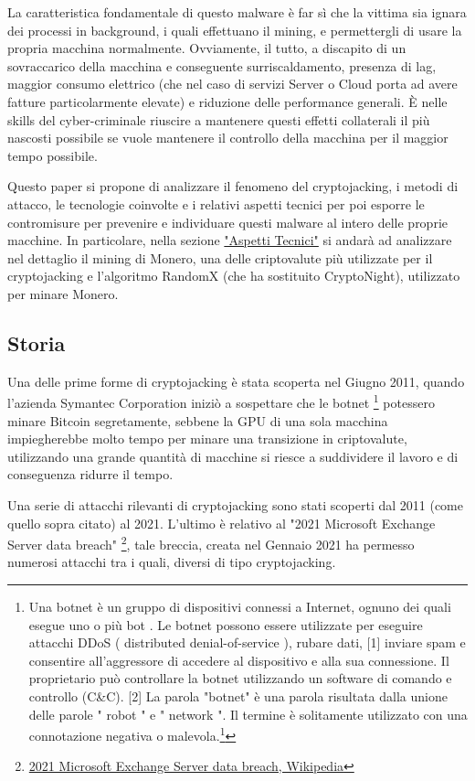 \documentclass[12pt,a4paper]{article}
\begin{document}
La caratteristica fondamentale di questo malware è far sì che la vittima sia
ignara dei processi in background, i quali effettuano il mining, e
permettergli di usare la propria macchina normalmente. Ovviamente, il tutto, a
discapito di un sovraccarico della macchina e conseguente surriscaldamento,
presenza di lag, maggior consumo elettrico (che nel caso di servizi Server o
Cloud porta ad avere fatture particolarmente elevate) e riduzione delle
performance generali. È nelle skills del cyber-criminale riuscire a mantenere 
questi effetti collaterali il più nascosti possibile se vuole mantenere il controllo della macchina per il maggior tempo possibile.

Questo paper si propone di analizzare il fenomeno del cryptojacking, i metodi di
attacco, le tecnologie coinvolte e i relativi aspetti tecnici per poi esporre le
contromisure per prevenire e individuare questi malware al intero delle proprie
macchine. In particolare, nella sezione \hyperref[sec:aspetti_tecnici]{"Aspetti
Tecnici"} si andarà ad analizzare nel dettaglio il mining di Monero, una delle
criptovalute più utilizzate per il cryptojacking e l'algoritmo RandomX (che ha
sostituito CryptoNight), utilizzato per minare Monero.

\subsection{Storia}

Una delle prime forme di cryptojacking è stata scoperta nel Giugno 2011, quando
l'azienda Symantec Corporation iniziò a sospettare che le botnet \footnote{Una
botnet è un gruppo di dispositivi connessi a Internet, ognuno dei quali esegue
uno o più bot . Le botnet possono essere utilizzate per eseguire attacchi DDoS (
distributed denial-of-service ), rubare dati, [1] inviare spam e consentire
all'aggressore di accedere al dispositivo e alla sua connessione. Il
proprietario può controllare la botnet utilizzando un software di comando e
controllo (C\&C). [2] La parola "botnet" è una parola risultata dalla unione
delle parole " robot " e " network ". Il termine è solitamente utilizzato con
una connotazione negativa o
malevola.\footnote{\href{https://arc.net/l/quote/ftyxgxms}{Botnet, Wikipedia}}}
potessero minare Bitcoin segretamente, sebbene la GPU di una sola macchina
impiegherebbe molto tempo per minare una transizione in criptovalute,
utilizzando una grande quantità di macchine si riesce a suddividere il lavoro e
di conseguenza ridurre il tempo.

Una serie di attacchi rilevanti di cryptojacking sono stati scoperti dal 2011
(come quello sopra citato) al 2021. L'ultimo è relativo al "2021 Microsoft
Exchange Server data breach"
\footnote{\href{https://arc.net/l/quote/golshtco}{2021 Microsoft Exchange Server
data breach, Wikipedia}}, tale breccia, creata nel Gennaio 2021 ha permesso
numerosi attacchi tra i quali, diversi di tipo cryptojacking.
\end{document}
